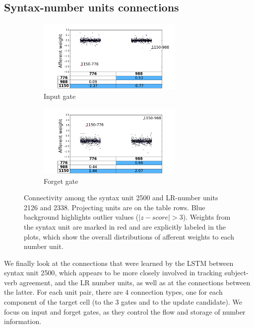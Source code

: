 \subsection{Syntax-number units connections}

\begin{figure}[t]
    \centering
    \begin{subfigure}{0.49\textwidth}
            \centering
            \includegraphics[height=3.5cm,width=\textwidth]{Figures/gate_Input_afferent_interactions.png}
            \caption{Input gate}
            \label{fig:interaction-input}
    \end{subfigure}
    \begin{subfigure}{0.49\textwidth}
           \centering
          \includegraphics[height=3.5cm,width=\textwidth]{Figures/gate_Forget_afferent_interactions.png}
          \caption{Forget gate}
          \label{fig:interaction-forget}
    \end{subfigure}
    \caption{Connectivity among the syntax unit \unit{2}{500} and
      LR-number units \unit{2}{126} and \unit{2}{338}. Projecting
      units are on the table rows. Blue background highlights outlier
      values ($|z-score|>3$). Weights from the syntax unit are marked in red
      and are explicitly labeled in the plots, which show the overall distributions of afferent weights to each number unit.}
\label{fig:interaction}
\end{figure}

We finally look at the connections that were learned by the LSTM
between syntax unit \unit{2}{500}, which appears to be more closely involved in
tracking subject-verb agreement, and the LR number units, as well as at
the connections between the latter. For each unit pair, there are 4
connection types, one for each component of the target cell (to the 3
gates and to the update candidate). We focus on input and forget gates, as they control the flow and storage of number information.

